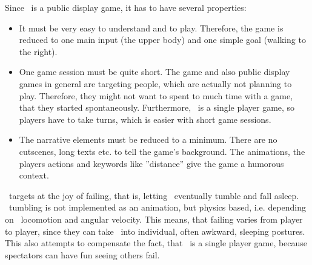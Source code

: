 Since \drunkened\ is a public display game, it has to have several properties:
\begin{itemize}\compresslist
\item It must be very easy to understand and to play. Therefore, the game is reduced to one main input (the upper body) and one simple goal (walking to the right).
\item One game session must be quite short. The game and also public display games in general are targeting people, which are actually not planning to play. Therefore, they might not want to spent to much time with a game, that they started spontaneously. Furthermore, \drunkened\ is a single player game, so players have to take turns, which is easier with short game sessions.
\item The narrative elements must be reduced to a minimum. There are no cutscenes, long texts etc. to tell the game's background. The animations, the players actions and keywords like ''distance'' give the game a humorous context.
\end{itemize}

\drunkened\ targets at the joy of failing, that is, letting \ed\ eventually tumble and fall asleep. \eds\ tumbling is not implemented as an animation, but physics based, i.e. depending on \eds\ locomotion and angular velocity. This means, that failing varies from player to player, since they can take \ed\ into individual, often awkward, sleeping postures. This also attempts to compensate the fact, that \drunkened\ is a single player game, because spectators can have fun seeing others fail.